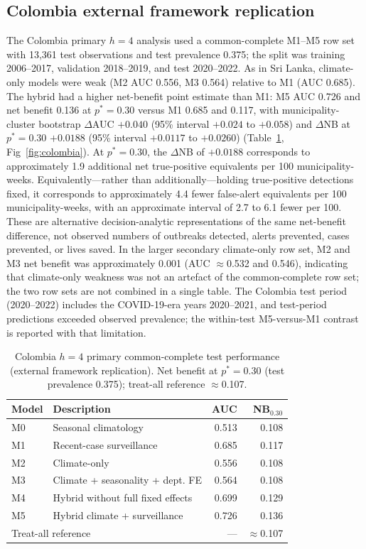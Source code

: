 \documentclass[11pt,a4paper]{article}
\begin{document}
\subsection{Colombia external framework replication}
The Colombia primary $h=4$ analysis used a common-complete M1--M5 row set with 13{,}361 test observations and test prevalence 0.375; the split was training 2006--2017, validation 2018--2019, and test 2020--2022. As in Sri Lanka, climate-only models were weak (M2 AUC 0.556, M3 0.564) relative to M1 (AUC 0.685). The hybrid had a higher net-benefit point estimate than M1: M5 AUC 0.726 and net benefit 0.136 at $p^*=0.30$ versus M1 0.685 and 0.117, with municipality-cluster bootstrap $\Delta$AUC $+0.040$ (95\% interval $+0.024$ to $+0.058$) and $\Delta$NB at $p^*=0.30$ $+0.0188$ (95\% interval $+0.0117$ to $+0.0260$) (Table~\ref{tab:colombia}, Fig~\ref{fig:colombia}). At $p^*=0.30$, the $\Delta$NB of $+0.0188$ corresponds to approximately 1.9 additional net true-positive equivalents per 100 municipality-weeks. Equivalently---rather than additionally---holding true-positive detections fixed, it corresponds to approximately 4.4 fewer false-alert equivalents per 100 municipality-weeks, with an approximate interval of 2.7 to 6.1 fewer per 100. These are alternative decision-analytic representations of the same net-benefit difference, not observed numbers of outbreaks detected, alerts prevented, cases prevented, or lives saved. In the larger secondary climate-only row set, M2 and M3 net benefit was approximately 0.001 (AUC $\approx$0.532 and 0.546), indicating that climate-only weakness was not an artefact of the common-complete row set; the two row sets are not combined in a single table. The Colombia test period (2020--2022) includes the COVID-19-era years 2020--2021, and test-period predictions exceeded observed prevalence; the within-test M5-versus-M1 contrast is reported with that limitation.

\begin{table}[htbp]
\centering
\caption{Colombia $h=4$ primary common-complete test performance (external framework replication). Net benefit at $p^*=0.30$ (test prevalence 0.375); treat-all reference $\approx$0.107.}
\label{tab:colombia}
\small
\begin{tabular}{llrr}
\toprule
Model & Description & AUC & NB$_{0.30}$ \\
\midrule
M0 & Seasonal climatology & 0.513 & 0.108 \\
M1 & Recent-case surveillance & 0.685 & 0.117 \\
M2 & Climate-only & 0.556 & 0.108 \\
M3 & Climate + seasonality + dept. FE & 0.564 & 0.108 \\
M4 & Hybrid without full fixed effects & 0.699 & 0.129 \\
M5 & Hybrid climate + surveillance & 0.726 & 0.136 \\
\midrule
\multicolumn{2}{l}{Treat-all reference} & --- & $\approx$0.107 \\
\bottomrule
\end{tabular}
\end{table}
\end{document}
